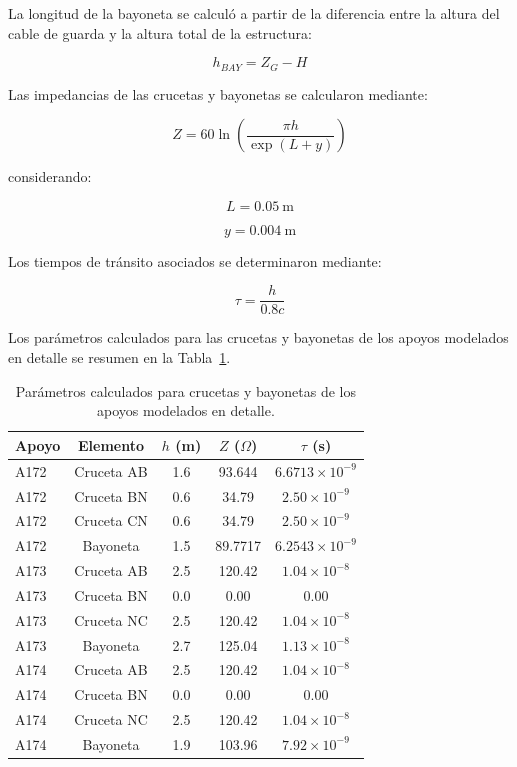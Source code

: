 \documentclass[12pt,letterpaper]{article}
\begin{document}
La longitud de la bayoneta se calculó a partir de la diferencia entre la altura del cable de guarda y la altura total de la estructura:

\begin{equation}
h_{BAY}=Z_G-H
\end{equation}


Las impedancias de las crucetas y bayonetas se calcularon mediante:

\begin{equation}
Z=
60\ln
\left(
\frac{\pi h}
{\exp(L+y)}
\right)
\end{equation}

considerando:

\begin{equation}
L=0.05\ \mathrm{m}
\end{equation}

\begin{equation}
y=0.004\ \mathrm{m}
\end{equation}

Los tiempos de tránsito asociados se determinaron mediante:

\begin{equation}
\tau=
\frac{h}{0.8c}
\end{equation}

Los parámetros calculados para las crucetas y bayonetas de los apoyos modelados en detalle se resumen en la Tabla~\ref{tab:crucetas_detalladas}.

\begin{table}[H]
\centering
\caption{Parámetros calculados para crucetas y bayonetas de los apoyos modelados en detalle.}
\label{tab:crucetas_detalladas}
\renewcommand{\arraystretch}{1.2}
\begin{tabular}{lcccc}
\toprule
Apoyo & Elemento & $h$ (m) & $Z$ ($\Omega$) & $\tau$ (s) \\
\midrule
A172 & Cruceta AB & 1.6 & 93.644 & $6.6713\times10^{-9}$ \\
A172 & Cruceta BN & 0.6 & 34.79 & $2.50\times10^{-9}$ \\
A172 & Cruceta CN & 0.6 & 34.79 & $2.50\times10^{-9}$ \\
A172 & Bayoneta & 1.5 & 89.7717 & $6.2543\times10^{-9}$ \\
A173 & Cruceta AB & 2.5 & 120.42 & $1.04\times10^{-8}$ \\
A173 & Cruceta BN & 0.0 & 0.00 & 0.00 \\
A173 & Cruceta NC & 2.5 & 120.42 & $1.04\times10^{-8}$ \\
A173 & Bayoneta & 2.7 & 125.04 & $1.13\times10^{-8}$ \\
A174 & Cruceta AB & 2.5 & 120.42 & $1.04\times10^{-8}$ \\
A174 & Cruceta BN & 0.0 & 0.00 & 0.00 \\
A174 & Cruceta NC & 2.5 & 120.42 & $1.04\times10^{-8}$ \\
A174 & Bayoneta & 1.9 & 103.96 & $7.92\times10^{-9}$ \\
\bottomrule
\end{tabular}
\end{table}
\end{document}
